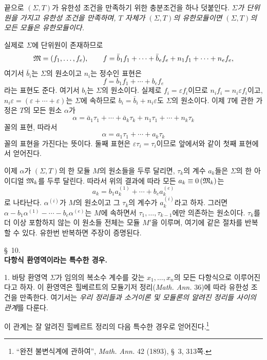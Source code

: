 끝으로 $(\Sigma,T)$가 유한성 조건을 만족하기 위한 충분조건을 하나 덧붙인다. \emph{$\Sigma$가 단위원을 가지고 유한성 조건을 만족하며, $T$ 자체가 $(\Sigma,T)$의 유한모듈이면 $(\Sigma,T)$의 모든 모듈은 유한모듈이다.}

실제로 $\Sigma$에 단위원이 존재하므로
\[
 \mathfrak{M}=(f_1,\ldots,f_e),\qquad
 f=\bar b_1f_1+\cdots+\bar b_e f_e+n_1f_1+\cdots+n_e f_e,
\]
여기서 $\bar b_i$는 $\Sigma$의 원소이고 $n_i$는 정수인 표현은
\[
 f=b_1f_1+\cdots+b_e f_e
\]
라는 표현도 준다. 여기서 $b_i$는 $\Sigma$의 원소이다. 실제로 $f_i=\varepsilon f_i$이므로 $n_if_i=n_i\varepsilon f_i$이고, $n_i\varepsilon=(\varepsilon+\cdots+\varepsilon)$는 $\Sigma$에 속하므로 $b_i=\bar b_i+n_i\varepsilon$도 $\Sigma$의 원소이다. 이제 $T$에 관한 가정은 $T$의 모든 원소 $\alpha$가
\[
 \alpha=\bar a_1\tau_1+\cdots+\bar a_k\tau_k
       +n_1\tau_1+\cdots+n_k\tau_k
\]
꼴의 표현, 따라서
\[
 \alpha=a_1\tau_1+\cdots+a_k\tau_k
\]
꼴의 표현을 가진다는 뜻이다. 둘째 표현은 $\varepsilon\tau_i=\tau_i$이므로 앞에서와 같이 첫째 표현에서 얻어진다.

이제 $\alpha$가 $(\Sigma,T)$의 한 모듈 $M$의 원소들을 두루 달리면, $\tau_k$의 계수 $a_k$들은 $\Sigma$의 한 아이디얼 $\mathfrak{M}_k$를 두루 달린다. 따라서 위의 결과에 따라 모든 $a_k\equiv 0\,(\mathfrak{M}_k)$는
\[
 a_k=b_1a_k^{(1)}+\cdots+b_ea_k^{(e)}
\]
로 나타난다. $\alpha^{(i)}$가 $M$의 원소이고 그 $\tau_k$의 계수가 $a_k^{(i)}$라고 하자. 그러면 $\alpha-b_1\alpha^{(1)}-\cdots-b_e\alpha^{(e)}$는 $M$에 속하면서 $\tau_1,\ldots,\tau_{k-1}$에만 의존하는 원소이다. $\tau_k$를 더 이상 포함하지 않는 이 원소들 전체는 모듈 $M'$을 이루며, 여기에 같은 절차를 반복할 수 있다. 유한번 반복하면 주장이 증명된다.

\begin{center}
\S~10.\\[0.25em]
\textbf{다항식 환영역이라는 특수한 경우.}
\end{center}

1. 바탕 환영역 $\Sigma$가 임의의 복소수 계수를 갖는 $x_1,\ldots,x_n$의 모든 다항식으로 이루어진다고 하자. 이 환영역은 힐베르트의 모듈기저 정리(\emph{Math. Ann.} 36)에 따라 유한성 조건을 만족한다. 여기서는 \emph{우리 정리들과 소거이론 및 모듈론의 알려진 정리들 사이의 관계}를 다룬다.

이 관계는 잘 알려진 힐베르트 정리의 다음 특수한 경우로 얻어진다.\footnote{``완전 불변식계에 관하여'', \emph{Math. Ann.} 42 (1893), \S~3, 313쪽.}


